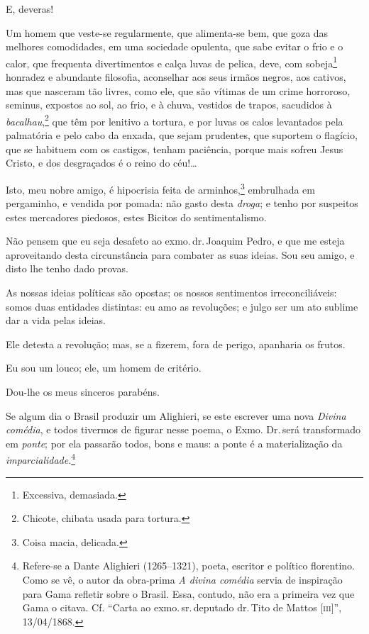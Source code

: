 {E, deveras!

Um homem que veste-se regularmente, que alimenta-se bem, que goza das
melhores comodidades, em uma sociedade opulenta, que sabe evitar o frio
e o calor, que frequenta divertimentos e calça luvas de pelica, deve,
com sobeja\footnote{Excessiva, demasiada.} honradez e abundante
filosofia, aconselhar aos seus irmãos negros, aos cativos, mas que
nasceram tão livres, como ele, que são vítimas de um crime horroroso,
seminus, expostos ao sol, ao frio, e à chuva, vestidos de trapos,
sacudidos à \emph{bacalhau},\footnote{Chicote, chibata usada para
  tortura.} que têm por lenitivo a tortura, e por luvas os calos
levantados pela palmatória e pelo cabo da enxada, que sejam prudentes,
que suportem o flagício, que se habituem com os castigos, tenham
paciência, porque mais sofreu Jesus Cristo, e dos desgraçados é o reino
do céu!\ldots{}

Isto, meu nobre amigo, é hipocrisia feita de arminhos,\footnote{Coisa
  macia, delicada.} embrulhada em pergaminho, e vendida por pomada: não
gasto desta \emph{droga}; e tenho por suspeitos estes mercadores
piedosos, estes Bicitos do sentimentalismo.

Não pensem que eu seja desafeto ao exmo.\,dr.\,Joaquim Pedro, e que me
esteja aproveitando desta circunstância para combater as suas ideias.
Sou seu amigo, e disto lhe tenho dado provas.

As nossas ideias políticas são opostas; os nossos sentimentos
irreconciliáveis: somos duas entidades distintas: eu amo as revoluções;
e julgo ser um ato sublime dar a vida pelas ideias.

Ele detesta a revolução; mas, se a fizerem, fora de perigo, apanharia os
frutos.

Eu sou um louco; ele, um homem de critério.

Dou-lhe os meus sinceros parabéns.

Se algum dia o Brasil produzir um Alighieri, se este escrever uma nova 
\emph{Divina comédia}, e todos tivermos de figurar nesse poema, o Exmo.
Dr.\,será transformado em \emph{ponte}; por ela passarão todos, bons e
maus: a ponte é a materialização da \emph{imparcialidade}.\footnote{
  Refere-se a Dante Alighieri (1265--1321), poeta, escritor e político
  florentino. Como se vê, o autor da obra-prima \emph{A divina
  comédia} servia de inspiração para Gama refletir sobre o Brasil.
  Essa, contudo, não era a primeira vez que Gama o citava. Cf.
  ``Carta ao exmo.\,sr.\,deputado dr.\,Tito de Mattos {[}\textsc{iii}{]}'',
  13/04/1868.}

}
